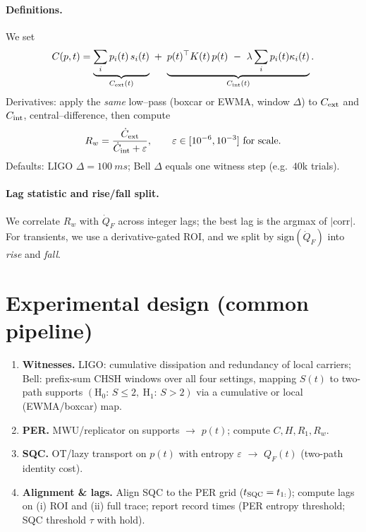 \documentclass[11pt]{article}
\begin{document}
\paragraph{Definitions.}
We set
\[
C(p,t)=\underbrace{\sum_i p_i(t)\,s_i(t)}_{C_{\rm ext}(t)}\ +\ \underbrace{p(t)^\top K(t)\,p(t)\ -\ \lambda\sum_i p_i(t)\kappa_i(t)}_{C_{\rm int}(t)}.
\]
Derivatives: apply the \emph{same} low–pass (boxcar or EWMA, window $\Delta$) to $C_{\rm ext}$ and $C_{\rm int}$, central–difference, then compute
\[
R_w=\frac{\dot C_{\rm ext}}{\dot C_{\rm int}+\varepsilon},\qquad \varepsilon\in[10^{-6},10^{-3}] \text{ for scale}.
\]
Defaults: LIGO $\Delta=\SI{100}{ms}$; Bell $\Delta$ equals one witness step (e.g.\ $40$k trials).

\paragraph{Lag statistic and rise/fall split.}
We correlate $R_w$ with $\dot Q_F$ across integer lags; the best lag is the argmax of $|\mathrm{corr}|$.
For transients, we use a derivative-gated ROI, and we split by $\mathrm{sign}(\dot Q_F)$ into \emph{rise} and \emph{fall}.

\section{Experimental design (common pipeline)}\label{sec:design}

\begin{enumerate}[leftmargin=1.2em, itemsep=2pt]
\item \textbf{Witnesses.}
LIGO: cumulative dissipation and redundancy of local carriers;
Bell: prefix-sum CHSH windows over all four settings, mapping $S(t)$ to two-path supports $(\mathrm{H}_0:\,S\!\le 2,\ \mathrm{H}_1:\,S>2)$ via a cumulative or local (EWMA/boxcar) map.
\item \textbf{PER.} MWU/replicator on supports $\to$ $p(t)$; compute $C,H,R_1,R_w$.
\item \textbf{SQC.} OT/lazy transport on $p(t)$ with entropy $\varepsilon$ $\to$ $Q_F(t)$ (two-path identity cost).
\item \textbf{Alignment \& lags.} Align SQC to the PER grid ($t_{\rm SQC}=t_{1:}$); compute lags on (i) ROI and (ii) full trace; report record times (PER entropy threshold; SQC threshold $\tau$ with hold).
\end{enumerate}

\end{document}
